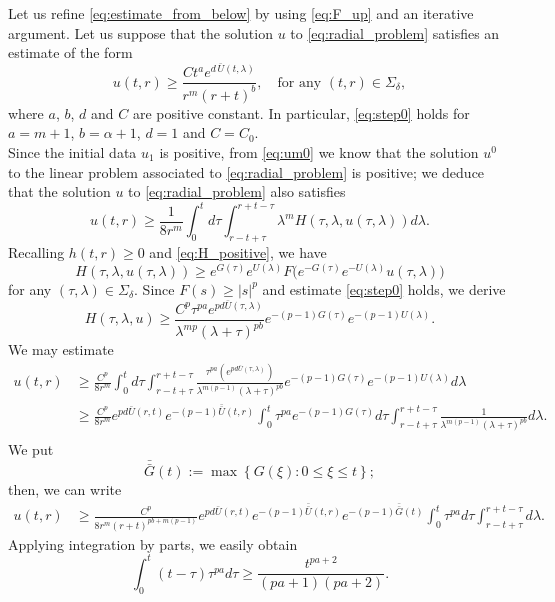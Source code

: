 \documentclass[11pt,reqno]{amsart}
\theoremstyle{definition}
\numberwithin{equation}{section}
\newcommand{\bbar}[1]{\bar{\bar{#1}}}
\begin{document}
Let us refine \eqref{eq:estimate_from_below} by using \eqref{eq:F_up} and an iterative argument. Let us suppose that the solution $u$ to \eqref{eq:radial_problem} satisfies an estimate of the form 
\begin{equation}
\label{eq:step0}
u(t,r)\geq \frac{Ct^a e^{d\,\bar U(t,\lambda)}} {r^m(r+t)^b}, \quad \text{for any } (t,r)\in \Sigma_\delta,
\end{equation}
where $a$, $b$, $d$ and $C$ are positive constant. In particular, \eqref{eq:step0} holds for $a=m+1$, $b=\alpha+1$, $d=1$ and $C=C_0$. \\
Since the initial data $u_1$ is positive, from \eqref{eq:um0} we know that the solution $u^0$ to the linear problem associated to \eqref{eq:radial_problem} is positive; we deduce that the solution $u$ to \eqref{eq:radial_problem} also satisfies 
\begin{equation*}
u(t,r)\geq \frac{1}{8r^m}\int_0^t d\tau \int_{r-t+\tau}^{r+t-\tau}\lambda^m H(\tau,\lambda, u(\tau,\lambda))d\lambda.
\end{equation*}
Recalling $h(t,r)\geq0$ and \eqref{eq:H_positive}, we have 
\[ H(\tau,\lambda, u(\tau,\lambda))\geq e^{G(\tau)}e^{U(\lambda)}F\Big(e^{-G(\tau)} e^{-U(\lambda)}u(\tau,\lambda)\Big)\]
%
for any $(\tau, \lambda)\in \Sigma_\delta$. Since $F(s)\geq |s|^p$ and estimate \eqref{eq:step0} holds, we derive 
%
\[ H(\tau,\lambda, u)\geq \frac{C^p\tau^{pa}e^{pd\bar U(\tau,\lambda)}}{\lambda^{mp}(\lambda + \tau)^{pb}}e^{-(p-1)G(\tau)}e^{-(p-1)U(\lambda)}.\]
%
We may estimate
\begin{equation}
\label{eq:mainstepproof}
\begin{aligned}
u(t,r)&\geq \frac{C^p}{8r^m}\int_0^t d\tau \int_{r-t+\tau}^{r+t-\tau}\frac{\tau^{pa}(e^{pd \bar U(\tau,\lambda)})}{\lambda^{m(p-1)}(\lambda+\tau)^{pb}}e^{-(p-1)G(\tau)}e^{-(p-1)U(\lambda)} d\lambda\\
%
&\geq \frac{C^p}{8r^m}e^{pd \bar U(r,t)}e^{-(p-1)\bbar U(t,r)}\int_0^t \tau^{pa} e^{-(p-1)G(\tau)}  d\tau \int_{r-t+\tau}^{r+t-\tau}\frac{1}{\lambda^{m(p-1)}(\lambda+\tau)^{pb}}  d\lambda.\\
\end{aligned}
\end{equation}
We put \begin{equation}
\bbar{G}(t):=\max\left\{G(\xi): 0\leq\xi\leq t\right\};
\end{equation}
then, we can write 
\begin{equation}
\begin{aligned}
u(t,r)& \geq\frac{C^p}{8r^m(r+t)^{pb+m(p-1)}}e^{pd \bar U(r,t)}e^{-(p-1)\bbar U(t,r)} e^{-(p-1)\bbar{G}(t)}\int_0^t \tau^{pa}d\tau \int_{r-t+\tau}^{r+t-\tau}d\lambda.
\end{aligned}
\end{equation}
Applying integration by parts, we easily obtain 
\begin{equation*}
\int_0^t (t-\tau)\tau^{pa}d\tau
\geq 
\frac{t^{pa+2}}{(pa+1)(pa+2)}.
\end{equation*}
\end{document}
